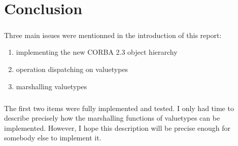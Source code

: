 \chapter{Conclusion}

\paragraph{}Three main issues were mentionned in the introduction of
this report:
\begin {enumerate}
\item implementing the new CORBA 2.3 object hierarchy
\item operation dispatching on valuetypes
\item marshalling valuetypes
\end{enumerate}

\paragraph{}The first two items were fully implemented and tested. I
only had time to describe precisely how the marshalling functions of
valuetypes can be implemented. However, I hope this description will
be precise enough for somebody else to implement it.